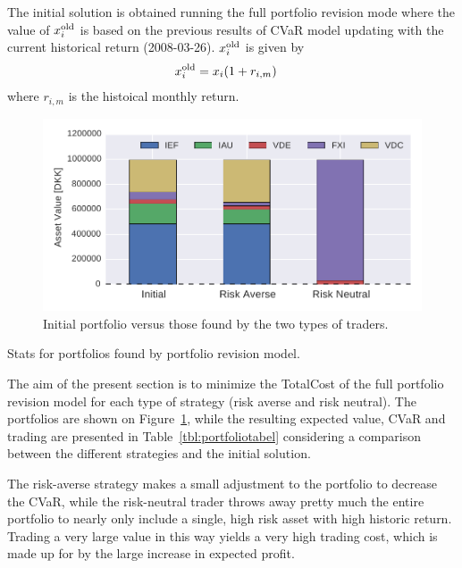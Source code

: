 The initial solution is obtained running the full portfolio revision mode where the value of $x^{\textup{old}}_{i}$  is based on the previous results of CVaR model updating with the current historical return (2008-03-26). 
$x^{\textup{old}}_{i}$  is given by
\begin{align}
x^{\textup{old}}_{i} &= x_{i} (1+ r_{i,m})
\end{align}
where $r_{i,m}$ is the histoical monthly return.

\begin{figure}[tpbh]
\centering
\includegraphics{../pic/portfoliorevision_portfolio.pdf}
\caption{Initial portfolio versus those found by the two types of traders.}
\label{fig:prevpf}
\end{figure}

\begin{table}
\caption{Stats for portfolios found by portfolio revision model.}\label{tbl:portfoliotabel}
\centering

\end{table}

The aim of the present section is to minimize the TotalCost of the full portfolio revision model for each type of strategy (risk averse and risk neutral).
The portfolios are shown on Figure~\ref{fig:prevpf}, while the resulting expected value, CVaR and trading are presented in Table~\ref{tbl:portfoliotabel} considering a comparison between the different strategies and the initial solution. 

The risk-averse strategy makes a small adjustment to the portfolio to decrease the CVaR, while the risk-neutral trader throws away pretty much the entire portfolio to nearly only include a single, high risk asset with high historic return.
Trading a very large value in this way yields a very high trading cost, which is made up for by the large increase in expected profit.